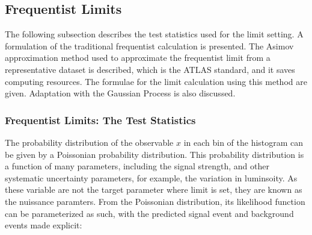 \subsection{Frequentist Limits}
\label{sec:freq}


The following subsection describes the test statistics used for the limit setting. A formulation of the traditional frequentist calculation is presented. The Asimov approximation method used to approximate the frequentist limit from a representative dataset is described, which is the ATLAS standard, and it saves computing resources. The formulae for the limit calculation using this method are given. Adaptation with the Gaussian Process is also discussed. 

\subsubsection{Frequentist Limits: The Test Statistics}
\label{sec:freqTestStats}

The probability distribution of the observable $x$ in each bin of the histogram can be given by a Poissonian probability distribution. This probability distribution is a function of many parameters, including the signal strength, and other systematic uncertainty parameters, for example, the variation in luminsoity. As these variable are not the target parameter where limit is set, they are known as the nuissance paramters. From the Poissonian distribution, its likelihood function can be parameterized as such, with the predicted signal event and background events made explicit:

